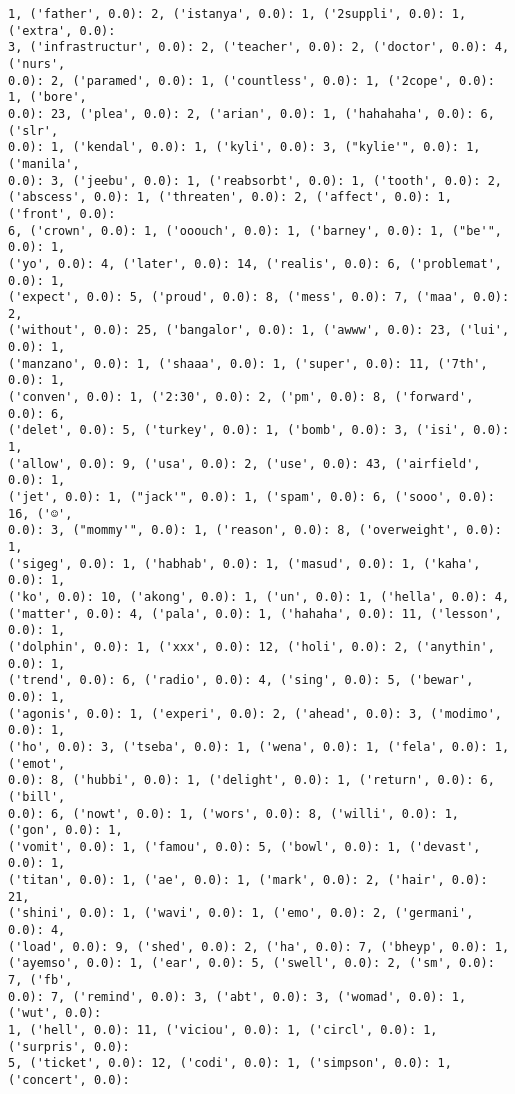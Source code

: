 \documentclass[11pt]{article}
\begin{document}
\begin{Verbatim}[commandchars=\\\{\}]
1, ('father', 0.0): 2, ('istanya', 0.0): 1, ('2suppli', 0.0): 1, ('extra', 0.0):
3, ('infrastructur', 0.0): 2, ('teacher', 0.0): 2, ('doctor', 0.0): 4, ('nurs',
0.0): 2, ('paramed', 0.0): 1, ('countless', 0.0): 1, ('2cope', 0.0): 1, ('bore',
0.0): 23, ('plea', 0.0): 2, ('arian', 0.0): 1, ('hahahaha', 0.0): 6, ('slr',
0.0): 1, ('kendal', 0.0): 1, ('kyli', 0.0): 3, ("kylie'", 0.0): 1, ('manila',
0.0): 3, ('jeebu', 0.0): 1, ('reabsorbt', 0.0): 1, ('tooth', 0.0): 2,
('abscess', 0.0): 1, ('threaten', 0.0): 2, ('affect', 0.0): 1, ('front', 0.0):
6, ('crown', 0.0): 1, ('ooouch', 0.0): 1, ('barney', 0.0): 1, ("be'", 0.0): 1,
('yo', 0.0): 4, ('later', 0.0): 14, ('realis', 0.0): 6, ('problemat', 0.0): 1,
('expect', 0.0): 5, ('proud', 0.0): 8, ('mess', 0.0): 7, ('maa', 0.0): 2,
('without', 0.0): 25, ('bangalor', 0.0): 1, ('awww', 0.0): 23, ('lui', 0.0): 1,
('manzano', 0.0): 1, ('shaaa', 0.0): 1, ('super', 0.0): 11, ('7th', 0.0): 1,
('conven', 0.0): 1, ('2:30', 0.0): 2, ('pm', 0.0): 8, ('forward', 0.0): 6,
('delet', 0.0): 5, ('turkey', 0.0): 1, ('bomb', 0.0): 3, ('isi', 0.0): 1,
('allow', 0.0): 9, ('usa', 0.0): 2, ('use', 0.0): 43, ('airfield', 0.0): 1,
('jet', 0.0): 1, ("jack'", 0.0): 1, ('spam', 0.0): 6, ('sooo', 0.0): 16, ('☺',
0.0): 3, ("mommy'", 0.0): 1, ('reason', 0.0): 8, ('overweight', 0.0): 1,
('sigeg', 0.0): 1, ('habhab', 0.0): 1, ('masud', 0.0): 1, ('kaha', 0.0): 1,
('ko', 0.0): 10, ('akong', 0.0): 1, ('un', 0.0): 1, ('hella', 0.0): 4,
('matter', 0.0): 4, ('pala', 0.0): 1, ('hahaha', 0.0): 11, ('lesson', 0.0): 1,
('dolphin', 0.0): 1, ('xxx', 0.0): 12, ('holi', 0.0): 2, ('anythin', 0.0): 1,
('trend', 0.0): 6, ('radio', 0.0): 4, ('sing', 0.0): 5, ('bewar', 0.0): 1,
('agonis', 0.0): 1, ('experi', 0.0): 2, ('ahead', 0.0): 3, ('modimo', 0.0): 1,
('ho', 0.0): 3, ('tseba', 0.0): 1, ('wena', 0.0): 1, ('fela', 0.0): 1, ('emot',
0.0): 8, ('hubbi', 0.0): 1, ('delight', 0.0): 1, ('return', 0.0): 6, ('bill',
0.0): 6, ('nowt', 0.0): 1, ('wors', 0.0): 8, ('willi', 0.0): 1, ('gon', 0.0): 1,
('vomit', 0.0): 1, ('famou', 0.0): 5, ('bowl', 0.0): 1, ('devast', 0.0): 1,
('titan', 0.0): 1, ('ae', 0.0): 1, ('mark', 0.0): 2, ('hair', 0.0): 21,
('shini', 0.0): 1, ('wavi', 0.0): 1, ('emo', 0.0): 2, ('germani', 0.0): 4,
('load', 0.0): 9, ('shed', 0.0): 2, ('ha', 0.0): 7, ('bheyp', 0.0): 1,
('ayemso', 0.0): 1, ('ear', 0.0): 5, ('swell', 0.0): 2, ('sm', 0.0): 7, ('fb',
0.0): 7, ('remind', 0.0): 3, ('abt', 0.0): 3, ('womad', 0.0): 1, ('wut', 0.0):
1, ('hell', 0.0): 11, ('viciou', 0.0): 1, ('circl', 0.0): 1, ('surpris', 0.0):
5, ('ticket', 0.0): 12, ('codi', 0.0): 1, ('simpson', 0.0): 1, ('concert', 0.0):

\end{Verbatim}
\end{document}
